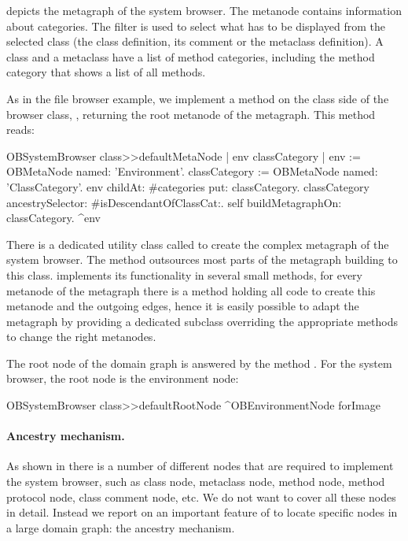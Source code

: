 \documentclass[a4paper,10pt,twoside]{book}
\begin{document}
 depicts the metagraph of the system browser. The metanode  contains information about categories. The filter is used to select what has to be displayed from the selected class (\ie the class definition, its comment or the metaclass definition). A class and a metaclass have a list of method categories, including the  method category that shows a list of all methods.

As in the file browser example, we implement a method  on the class side of the browser class, \ie {}, returning the root metanode of the metagraph. This method reads:

\begin{code}{}
OBSystemBrowser class>>defaultMetaNode
	| env classCategory |
	env := OBMetaNode named: 'Environment'.
	classCategory := OBMetaNode named: 'ClassCategory'.
	env childAt: #categories put: classCategory.
	classCategory ancestrySelector: #isDescendantOfClassCat:.
	self buildMetagraphOn: classCategory.
	^env
\end{code}

There is a dedicated utility class called  to create the complex metagraph of the system browser. The method  outsources most parts of the metagraph building to this class.  implements its functionality in several small methods, \ie for every metanode of the metagraph there is a method holding all code to create this metanode and the outgoing edges, hence it is easily possible to adapt the metagraph by providing a dedicated subclass overriding the appropriate methods to change the right metanodes. 

The root node of the domain graph is answered by the method . For the system browser, the root node is the environment node:

\begin{code}{}
OBSystemBrowser class>>defaultRootNode
	^OBEnvironmentNode forImage
\end{code}


\paragraph{Ancestry mechanism.} As shown in  there is a number of different nodes that are required to implement the system browser, such as class node, metaclass node, method node, method protocol node, class comment node, etc. We do not want to cover all these nodes in detail. Instead we report on an important feature of \obf to locate specific nodes in a large domain graph: the ancestry mechanism. 
\end{document}

